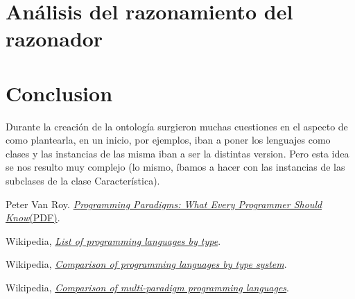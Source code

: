 \documentclass[12pt, titlepage, a4paper]{article}
\begin{document}
\section{Análisis del razonamiento del razonador}


\section{Conclusion}
Durante la creación de la ontología surgieron muchas cuestiones en el 
aspecto de como plantearla, en un inicio, por ejemplos, iban a poner 
los lenguajes como clases y las instancias de las misma iban a ser la 
distintas version. Pero esta idea se nos resulto muy complejo 
(lo mismo, íbamos a hacer con las instancias de las subclases de 
la clase Característica).


\begin{thebibliography}{999}

      Peter Van Roy. 
      \href{https://webperso.info.ucl.ac.be/~pvr/VanRoyChapter.pdf}{\emph{Programming Paradigms: What Every Programmer Should 
      Know}(PDF)}.
    
      Wikipedia, \href{https://en.wikipedia.org/wiki/List_of_programming_languages_by_type}{\emph{List of programming languages by type}}.
    
      Wikipedia, \href{https://en.wikipedia.org/wiki/Comparison_of_programming_languages_by_type_system}{\emph{Comparison of programming languages by type system}}.
    
      Wikipedia, \href{https://en.wikipedia.org/wiki/Comparison_of_multi-paradigm_programming_languages}{\emph{Comparison of multi-paradigm programming languages}}.
    
    
\end{thebibliography}
\end{document}
